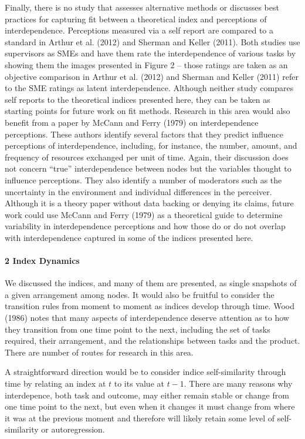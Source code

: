 \documentclass[english,,man]{apa6}
\let\oldparagraph\paragraph
\renewcommand{\paragraph}[1]{\oldparagraph{#1}\mbox{}}
\theoremstyle{definition}
\theoremstyle{definition}
\theoremstyle{definition}
\theoremstyle{remark}
\begin{document}
Finally, there is no study that assesses alternative methods or
discusses best practices for capturing fit between a theoretical index
and perceptions of interdependence. Perceptions measured via a self
report are compared to a standard in Arthur et al. (2012) and Sherman
and Keller (2011). Both studies use supervisors as SMEs and have them
rate the interdependence of various tasks by showing them the images
presented in Figure 2 -- those ratings are taken as an objective
comparison in Arthur et al. (2012) and Sherman and Keller (2011) refer
to the SME ratings as latent interdependence. Although neither study
compares self reports to the theoretical indices presented here, they
can be taken as starting points for future work on fit methods. Research
in this area would also benefit from a paper by McCann and Ferry (1979)
on interdependence perceptions. These authors identify several factors
that they predict influence perceptions of interdependence, including,
for instance, the number, amount, and frequency of resources exchanged
per unit of time. Again, their discussion does not concern
\enquote{true} interdependence between nodes but the variables thought
to influence perceptions. They also identify a number of moderators such
as the uncertainty in the environment and individual differences in the
perceiver. Although it is a theory paper without data backing or denying
its claims, future work could use McCann and Ferry (1979) as a
theoretical guide to determine variability in interdependence
perceptions and how those do or do not overlap with interdependence
captured in some of the indices presented here.

\hypertarget{index-dynamics}{%
\paragraph{2 Index Dynamics}\label{index-dynamics}}

We discussed the indices, and many of them are presented, as single
snapshots of a given arrangement among nodes. It would also be fruitful
to consider the transition rules from moment to moment as indices
develop through time. Wood (1986) notes that many aspects of
interdependence deserve attention as to how they transition from one
time point to the next, including the set of tasks required, their
arrangement, and the relationships between tasks and the product. There
are number of routes for research in this area.

A straightforward direction would be to consider indice self-similarity
through time by relating an index at \(t\) to its value at \(t-1\).
There are many reasons why interdepence, both task and outcome, may
either remain stable or change from one time point to the next, but even
when it changes it must change from where it was at the previous moment
and therefore will likely retain some level of self-similarity or
autoregression.
\end{document}
